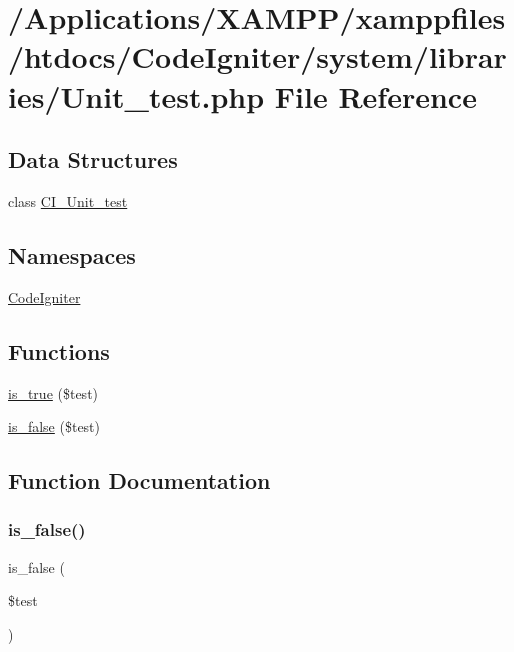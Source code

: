 \hypertarget{_unit__test_8php}{}\section{/\+Applications/\+X\+A\+M\+P\+P/xamppfiles/htdocs/\+Code\+Igniter/system/libraries/\+Unit\+\_\+test.php File Reference}
\label{_unit__test_8php}
\subsection*{Data Structures}
\begin{DoxyCompactItemize}
\item 
class \mbox{\hyperlink{class_c_i___unit__test}{C\+I\+\_\+\+Unit\+\_\+test}}
\end{DoxyCompactItemize}
\subsection*{Namespaces}
\begin{DoxyCompactItemize}
\item 
 \mbox{\hyperlink{namespace_code_igniter}{Code\+Igniter}}
\end{DoxyCompactItemize}
\subsection*{Functions}
\begin{DoxyCompactItemize}
\item 
\mbox{\hyperlink{_unit__test_8php_acf75638429e85f5d2eb23c85ce46f85b}{is\+\_\+true}} (\$test)
\item 
\mbox{\hyperlink{_unit__test_8php_a2fdef4e023452d31fcf5b3085bc9b25f}{is\+\_\+false}} (\$test)
\end{DoxyCompactItemize}


\subsection{Function Documentation}
\mbox{\label{_unit__test_8php_a2fdef4e023452d31fcf5b3085bc9b25f}} 
\subsubsection{\texorpdfstring{is\+\_\+false()}{is\_false()}}
{\footnotesize\ttfamily is\+\_\+false (\begin{DoxyParamCaption}\item[{}]{\$test }\end{DoxyParamCaption})}

